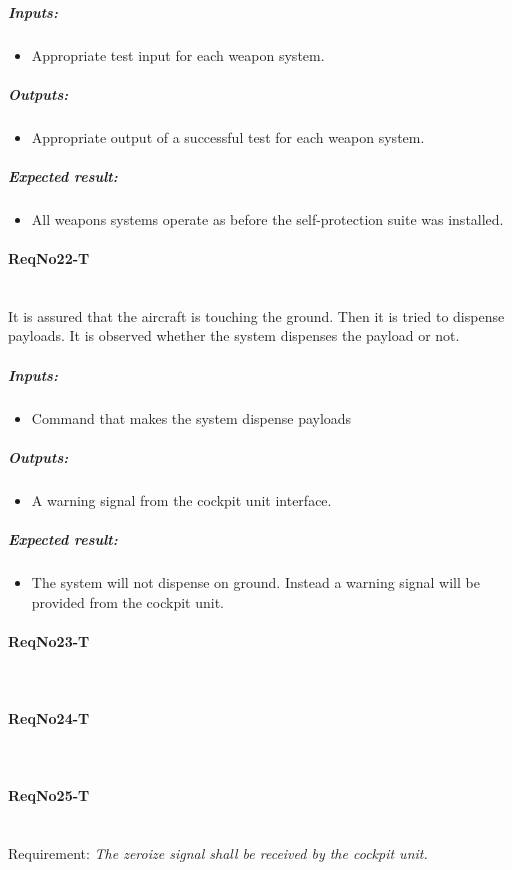 	\subparagraph{Inputs:}
	\begin{itemize}
	\item Appropriate test input for each weapon system.
	\end{itemize}
	\subparagraph{Outputs:}
	\begin{itemize}
	\item Appropriate output of a successful test for each weapon system.
	\end{itemize}
	\subparagraph{Expected result:}
	\begin{itemize}
	\item All weapons systems operate as before the self-protection suite was installed.
	\end{itemize}

\paragraph{ReqNo22-T}\mbox{}\\ %
It is assured that the aircraft is touching the ground. Then it is tried to dispense payloads. It is observed whether the system dispenses the payload or not.
\\
	\subparagraph{Inputs:}
	\begin{itemize}
	\item Command that makes the system dispense payloads 
	\end{itemize}
	\subparagraph{Outputs:}
	\begin{itemize}
	\item A warning signal from the cockpit unit interface.
	\end{itemize}
	\subparagraph{Expected result:}
	\begin{itemize}
	\item The system will not dispense on ground. Instead a warning signal will be provided from the cockpit unit.
	\end{itemize}

\paragraph{ReqNo23-T}\mbox{}\\ %


\paragraph{ReqNo24-T}\mbox{}\\ %

\paragraph{ReqNo25-T}\mbox{}\\ %
Requirement: \textit{The zeroize signal shall be received by the cockpit unit.}\\

